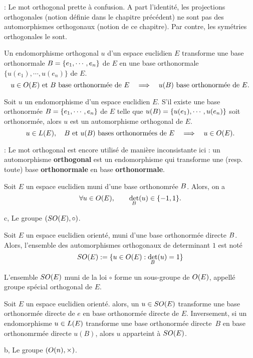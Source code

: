  \Remarque : Le mot orthogonal prette à confusion. A part l'identité, les projections orthogonales (notion définie dans le chapitre précédent) ne sont pas des automorphismes orthogonaux (notion de ce chapitre). Par contre, les symétries orthogonales le sont. 
\bigskip

\Propriete []  Un endomorphisme orthogonal $u$ d'un espace euclidien $E$ transforme une base orthonormale $\sc B=\{e_1,\cdots,e_n\}$ de $E$ en une base orthonormale $\{u(e_1),\cdots,u(e_n)\}$ de $E$. 
$$
u\in\sc O(E)\mbox{ et }\sc B\mbox{ base orthonormée de }E\quad \Longrightarrow\quad u(\sc B)\mbox{ base orthonormée de }E.
$$
 

\Propriete []  Soit $u$ un endomorphisme d'un espace euclidien $E$. S'il existe une base orthonormée $\sc B=\{e_1,\cdots,e_n\}$ de $E$ telle que 
$u(\sc B)=\{u(e_1),\cdots,u(e_n)\}$ soit orthonormée, alors $u$ est un automorphisme orthogonal de $E$. 
$$
u\in\sc L(E), \quad \sc B\mbox{ et }u(\sc B)\mbox{ bases orthonormées de }E\quad \Longrightarrow\quad u\in\sc O(E).
$$

 \Remarque :  Le mot orthogonal est encore utilisé de manière inconsistante ici : un automorphisme {\bf orthogonal} est un endomorphisme qui transforme une (resp. toute) base {\bf orthonormale} en base {\bf orthonormale}. 
\bigskip

\Propriete []  Soit $E$ un espace euclidien muni d'une base orthonomrée $\sc B$. Alors, on a 
$$
\forall u\in\sc O(E), \qquad \det_{\sc B}(u)\in\{-1,1\}. 
$$

\Subsection c, Le groupe $(\sc{SO}(E),\circ)$. 

\Definition []  Soit $E$ un espace euclidien orienté, muni d'une base orthonormée directe $\sc B$. 
Alors, l'ensemble des automorphismes orthogonaux de determinant $1$ est noté 
$$
\sc{SO}(E):=\{u\in\sc O(E):\det_{\sc B}(u)=1\}
$$

\Propriete []  L'ensemble $\sc{SO}(E)$ muni de la loi $\circ$ forme un sous-groupe de $\sc O(E)$, 
appellé groupe spécial orthogonal de $E$. 
\bigskip

\Propriete []  Soit $E$ un espace euclidien orienté. alors, un $u\in\sc{SO}(E)$ transforme 
une base orthonormée directe de $e$ en base orthonormée directe de $E$. \medskip
\noindent
Inversement, si un endomorphisme $u\in\sc L(E)$ transforme une base orthonormée directe~$B$ en base orthonomrmée directe $u(B)$, 
alors $u$ apparteint à $\sc{SO}(E)$. 
\bigskip

\Subsection b, Le groupe $(\sc O(n),\times)$. 



